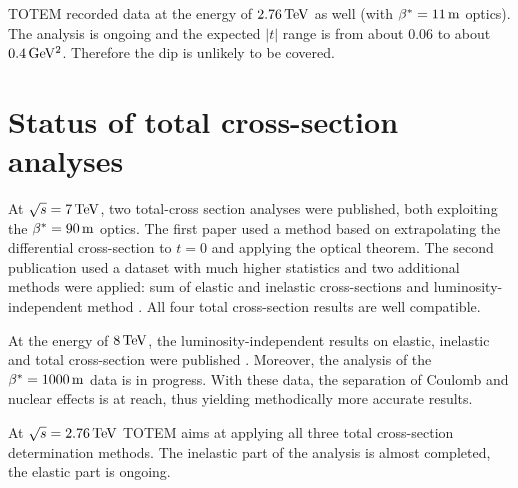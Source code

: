 \documentclass{desyproc}
\def\un#1{\,{\rm #1}}
\begin{document}
TOTEM recorded data at the energy of $2.76\un{TeV}$ as well (with $\beta^*=11\un{m}$ optics). The analysis is ongoing and the expected $|t|$ range is from about $0.06$ to about $0.4\un{GeV^2}$. Therefore the dip is unlikely to be covered.

\section{Status of total cross-section analyses}

At $\sqrt s =7\un{TeV}$, two total-cross section analyses were published, both exploiting the $\beta^*=90\un{m}$ optics. The first paper \cite{si_el_7_90a} used a method based on extrapolating the differential cross-section to $t = 0$ and applying the optical theorem. The second publication \cite{si_el_7_90b} used a dataset with much higher statistics and two additional methods were applied: sum of elastic and inelastic cross-sections \cite{si_inel_7} and luminosity-independent method \cite{si_tot_7}. All four total cross-section results are well compatible.

At the energy of $8\un{TeV}$, the luminosity-independent results on elastic, inelastic and total cross-section were published \cite{si_tot_8}. Moreover, the analysis of the $\beta^*=1000\un{m}$ data is in progress. With these data, the separation of Coulomb and nuclear effects is at reach, thus yielding methodically more accurate results.

At $\sqrt s = 2.76\un{TeV}$ TOTEM aims at applying all three total cross-section determination methods. The inelastic part of the analysis is almost completed, the elastic part is ongoing.


 

\def\Name#1{#1,}
\def\Review#1#2#3#4{#1 {\bf#2} #4 (#3)}
\end{document}
